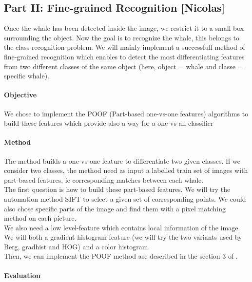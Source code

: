 \documentclass[11pt,a4paper,oneside]{article}
\begin{document}
\subsection*{Part II: Fine-grained Recognition [Nicolas]}
Once the whale has been detected inside the image, we restrict it to a small box surrounding the object. Now the goal is to recognize the whale, this belongs to the class recognition problem. We will mainly implement a successfull method of fine-grained recognition which enables to detect the most differentiating features from two different classes of the same object (here, object = whale and classe = specific whale).

\paragraph{Objective}

We chose to implement the POOF (Part-based one-vs-one features) algorithms to build these features which provide also a way for a one-vs-all classifier

\paragraph{Method}

The method builds a one-vs-one feature to differentiate two given classes.
If we consider two classes, the method need as input a labelled train set of images with part-based features, ie corresponding matches between each whale.\\

The first question is how to build these part-based features. We will try the automation method SIFT to select a given set of corresponding points. We could also chose specific parts of the image and find them with a pixel matching method on each picture.\\

We also need a low level-feature which contains local information of the image. We will both a gradient histogram feature (we will try the two variants used by Berg, gradhist and HOG) and a color histogram.\\

Then, we can implement the POOF method ase described in the section 3 of \cite{berg-poof-cvpr2013}.

\paragraph{Evaluation}
\end{document}
